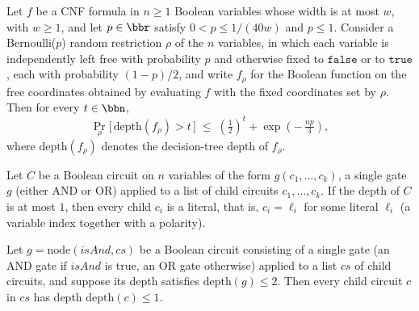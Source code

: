 \begin{theorem}
\label{LMN.switching_bernoulli_dtDepth_cnf_general}
\leanok
{}
Let $f$ be a CNF formula in $n \ge 1$ Boolean variables whose width is at most $w$, with
$w \ge 1$, and let $p \in \bbr$ satisfy $0 < p \le 1/(40w)$ and $p \le 1$. Consider a
Bernoulli($p$) random restriction $\rho$ of the $n$ variables, in which each variable is
independently left free with probability $p$ and otherwise fixed to $\mathtt{false}$ or
to $\mathtt{true}$, each with probability $(1-p)/2$, and write $f_\rho$ for the Boolean
function on the free coordinates obtained by evaluating $f$ with the fixed coordinates
set by $\rho$. Then for every $t \in \bbn$,
\[
\Pr_{\rho}\bigl[\,\mathrm{depth}(f_\rho) > t\,\bigr] \;\le\; \left(\tfrac12\right)^{t} +
\exp\!\left(-\,\tfrac{np}{3}\right),
\]
where $\mathrm{depth}(f_\rho)$ denotes the decision-tree depth of $f_\rho$.
\end{theorem}

\begin{lemma}
\label{LMN.depth_le_one_children_are_lits}
\leanok
{}
Let $C$ be a Boolean circuit on $n$ variables of the form $g(c_1,\dots,c_k)$, a single
gate $g$ (either AND or OR) applied to a list of child circuits $c_1,\dots,c_k$. If the
depth of $C$ is at most $1$, then every child $c_i$ is a literal, that is, $c_i =
\ell_i$ for some literal $\ell_i$ (a variable index together with a polarity).
\end{lemma}

\begin{lemma}
\label{LMN.depth_le_two_children_depth_le_one}
\leanok
{}
Let $g = \mathrm{node}(\mathit{isAnd}, cs)$ be a Boolean circuit consisting of a single
gate (an AND gate if $\mathit{isAnd}$ is true, an OR gate otherwise) applied to a list
$cs$ of child circuits, and suppose its depth satisfies $\mathrm{depth}(g) \le 2$. Then
every child circuit $c$ in $cs$ has depth $\mathrm{depth}(c) \le 1$.
\end{lemma}

